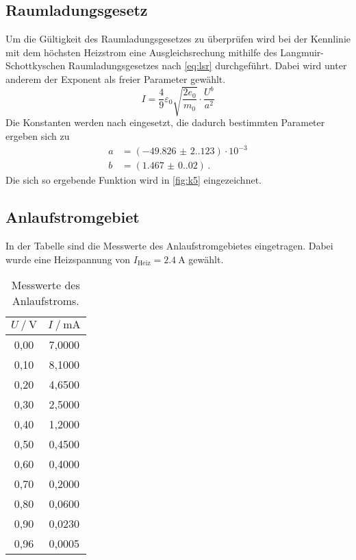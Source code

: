 \subsection{Raumladungsgesetz}

Um die Gültigkeit des Raumladungsgesetzes zu überprüfen wird bei der Kennlinie mit
dem höchsten Heizstrom eine Ausgleichsrechung mithilfe des Langmuir-Schottkyschen
Raumladungsgesetzes nach \autoref{eq:lsr} durchgeführt. 
Dabei wird unter anderem der Exponent als freier Parameter gewählt.
\begin{equation*}
  I= \frac{4}{9} \varepsilon_{0} \sqrt{\frac{2 e_{0}}{m_{0}}} \cdot \frac{U^{b}}{a^2}
\end{equation*}
Die Konstanten werden nach \cite{constants} eingesetzt, die dadurch bestimmten Parameter ergeben sich zu
\begin{align*}
  a &= (\num{-49.826(2.123)}) \cdot 10^{-3} \\
  b &= (\num{1.467(0.020)}) \, . 
\end{align*}
Die sich so ergebende Funktion wird in \autoref{fig:k5} eingezeichnet.

\subsection{Anlaufstromgebiet}

In der Tabelle sind die Messwerte des Anlaufstromgebietes eingetragen. Dabei wurde
eine Heizspannung von $I_{\text{Heiz}} = \qty{2.4}{\ampere}$ gewählt.
\begin{table}
  \centering
  \caption{Messwerte des Anlaufstroms.}
  \label{tab:anlaufstrom}
  \begin{tabular}{c c}
    \toprule
    $U \mathbin{/} \unit{\volt}$ &
    $I \mathbin{/} \unit{\milli\ampere}$ \\
    \midrule
    0,00 & 7,0000 \\
    0,10 & 8,1000 \\
    0,20 & 4,6500 \\
    0,30 & 2,5000 \\
    0,40 & 1,2000 \\
    0,50 & 0,4500 \\
    0,60 & 0,4000 \\
    0,70 & 0,2000 \\
    0,80 & 0,0600 \\
    0,90 & 0,0230 \\
    0,96 & 0,0005 \\
    \bottomrule
  \end{tabular}
\end{table}

